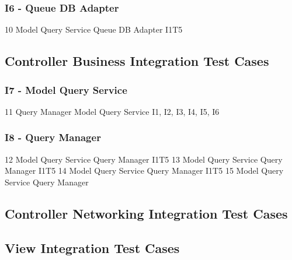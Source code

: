\subsubsection{I6 - Queue DB Adapter}
\testCaseSimpleSimple
	{10}
	{Model Query Service}
	{Queue DB Adapter}
	{I1T5}
\subsection{Controller Business Integration Test Cases}
\subsubsection{I7 - Model Query Service}
\testCaseSimpleSimple
	{11}
	{Query Manager}
	{Model Query Service}
	{I1, I2, I3, I4, I5, I6}
	{}
\subsubsection{I8 - Query Manager}
\testCaseSimpleSimple
	{12}
	{Model Query Service}
	{Query Manager}
	{I1T5}
	{}
\testCaseSimpleSimple
	{13}
	{Model Query Service}
	{Query Manager}
	{I1T5}
	{}
\testCaseSimpleSimple
	{14}
	{Model Query Service}
	{Query Manager}
	{I1T5}
	{}
\testCaseSimpleSimple
	{15}
	{Model Query Service}
	{Query Manager}
	{}
\subsection{Controller Networking Integration Test Cases}
\subsection{View Integration Test Cases}